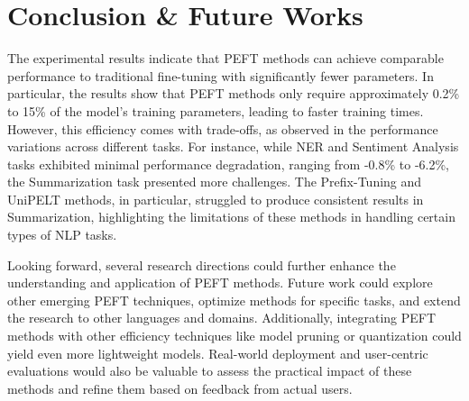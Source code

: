 \section{Conclusion \& Future Works}

The experimental results indicate that PEFT methods can achieve comparable performance to traditional fine-tuning with significantly fewer parameters. In particular, the results show that PEFT methods only require approximately 0.2\% to 15\% of the model’s training parameters, leading to faster training times. However, this efficiency comes with trade-offs, as observed in the performance variations across different tasks. For instance, while NER and Sentiment Analysis tasks exhibited minimal performance degradation, ranging from -0.8\% to -6.2\%, the Summarization task presented more challenges. The Prefix-Tuning and UniPELT methods, in particular, struggled to produce consistent results in Summarization, highlighting the limitations of these methods in handling certain types of NLP tasks.

Looking forward, several research directions could further enhance the understanding and application of PEFT methods. Future work could explore other emerging PEFT techniques, optimize methods for specific tasks, and extend the research to other languages and domains. Additionally, integrating PEFT methods with other efficiency techniques like model pruning or quantization could yield even more lightweight models. Real-world deployment and user-centric evaluations would also be valuable to assess the practical impact of these methods and refine them based on feedback from actual users.


